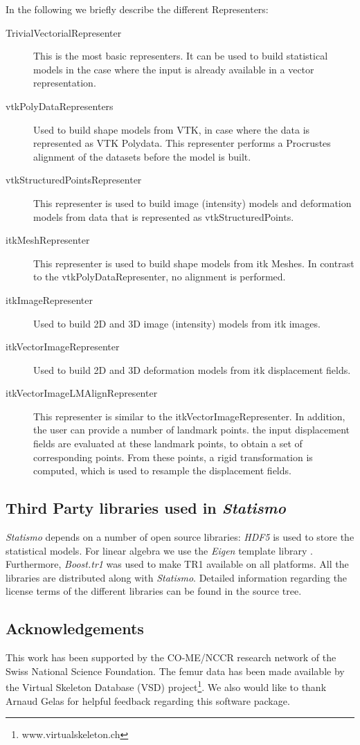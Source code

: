 \documentclass{InsightArticle}
\newcommand{\Statismo}{\emph{Statismo}\xspace}
\begin{document}
In the following we briefly describe the different Representers:
\begin{description}
\item[TrivialVectorialRepresenter] This is the most basic representers. It can be used to build statistical models in the case where the input is already available in a vector representation. 
\item[vtkPolyDataRepresenters] Used to build shape models from VTK, in case where the data is represented as VTK Polydata. This representer 
  performs a Procrustes alignment \cite{horn_closed-form_1987} of the datasets before the model is built. 
\item[vtkStructuredPointsRepresenter] This representer is used to
  build image (intensity) models and deformation models from data that is
  represented as vtkStructuredPoints. 
\item[itkMeshRepresenter] This representer is used to build shape
  models from itk Meshes.  In contrast to the vtkPolyDataRepresenter,
  no alignment is performed.
\item[itkImageRepresenter] Used to build 2D and 3D image (intensity) models from itk images. 
\item[itkVectorImageRepresenter] Used to build 2D and 3D deformation models from itk displacement fields. 
\item[itkVectorImageLMAlignRepresenter] This representer is similar to the itkVectorImageRepresenter. 
  In addition, the user can provide a number of landmark points. the input displacement fields are evaluated
  at these landmark points, to obtain a set of corresponding points. From these points, a rigid transformation is computed, 
  which is used to resample the displacement fields. 

\end{description}

\subsection{Third Party libraries used in \Statismo}
\Statismo depends on a number of open source libraries: \emph{HDF5} \cite{hdf5} is used to store the statistical models. 
For linear algebra we use the \emph{Eigen} template library \cite{eigenweb}. Furthermore, \emph{Boost.tr1} was used to make TR1 available on all platforms. 
All the libraries are distributed along with \Statismo. Detailed information regarding the license terms of the different libraries can be found in the source tree.

\subsection*{Acknowledgements}
This work has been supported by the CO-ME/NCCR research network of
the Swiss National Science Foundation. The femur data has been made available by the Virtual Skeleton Database (VSD) project\footnote{www.virtualskeleton.ch}. We also would like to thank Arnaud Gelas for helpful feedback regarding 
this software package. 


%
%



\end{document}
